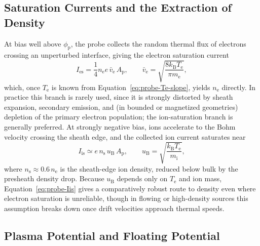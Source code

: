 \subsection{Saturation Currents and the Extraction of Density}

At bias well above $\phi_{\mathrm{p}}$, the probe collects the random thermal flux of electrons crossing an unperturbed interface, giving the electron saturation current
\begin{equation}
I_{\mathrm{es}} = \frac{1}{4} n_{\mathrm{e}} e \, \bar{v}_{\mathrm{e}} \, A_{\mathrm{p}}, \qquad
\bar{v}_{\mathrm{e}} = \sqrt{\frac{8 k_{\mathrm{B}} T_{\mathrm{e}}}{\pi m_{\mathrm{e}}}},
\label{eq:probe-Ies}
\end{equation}
which, once $T_{\mathrm{e}}$ is known from Equation~\eqref{eq:probe-Te-slope}, yields $n_{\mathrm{e}}$ directly. In practice this branch is rarely used, since it is strongly distorted by sheath expansion, secondary emission, and (in bounded or magnetized geometries) depletion of the primary electron population; the ion-saturation branch is generally preferred. At strongly negative bias, ions accelerate to the Bohm velocity crossing the sheath edge, and the collected ion current saturates near
\begin{equation}
I_{\mathrm{is}} \simeq e\, n_{\mathrm{s}}\, u_{\mathrm{B}} \, A_{\mathrm{p}}, \qquad
u_{\mathrm{B}} = \sqrt{\frac{k_{\mathrm{B}} T_{\mathrm{e}}}{m_{\mathrm{i}}}},
\label{eq:probe-Iis}
\end{equation}
where $n_{\mathrm{s}} \approx 0.6\, n_{\mathrm{e}}$ is the sheath-edge ion density, reduced below bulk by the presheath density drop. Because $u_{\mathrm{B}}$ depends only on $T_{\mathrm{e}}$ and ion mass, Equation~\eqref{eq:probe-Iis} gives a comparatively robust route to density even where electron saturation is unreliable, though in flowing or high-density sources this assumption breaks down once drift velocities approach thermal speeds.

\subsection{Plasma Potential and Floating Potential}

